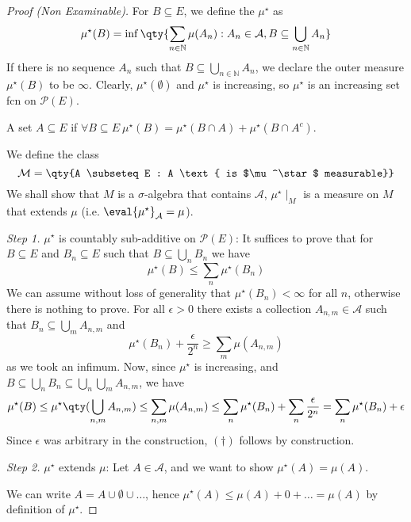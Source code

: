\begin{proof}[Proof (Non Examinable)]
	For $B \subseteq E$, we define the  $\mu^\star$ as
	\[ \mu^\star(B) = \inf \qty{\sum_{n \in \mathbb N} \mu(A_n) : A_n \in \mathcal A, B \subseteq \bigcup_{n \in \mathbb N} A_n} \]
	If there is no sequence $A_n$ such that $B \subseteq \bigcup_{n \in \mathbb N} A_n$, we declare the outer measure $\mu^\star(B)$ to be $\infty$.
	Clearly, $\mu^\star(\emptyset)$ and $\mu^\star$ is increasing, so $\mu^\star$ is an increasing set fcn on $\mathcal{P}(E)$.

	\begin{definition}
		A set $A \subseteq E$  if $\forall B \subseteq E \ \mu^\star(B) = \mu^\star(B \cap A) + \mu^\star(B \cap A^c)$.
	\end{definition}

	We define the class
	\[ \mathcal M = \qty{A \subseteq E : A \text{ is $\mu^\star$ measurable}} \]
	We shall show that $M$ is a $\sigma$-algebra that contains $\mathcal{A}$, $\mu^\star \mid_M$ is a measure on $M$ that extends $\mu$ (i.e. $\eval{\mu^\star}_\mathcal{A} = \mu$).

	\emph{Step 1.} $\mu^\star$ is countably sub-additive on $\mathcal P(E)$:
	It suffices to prove that for $B \subseteq E$ and $B_n \subseteq E$ such that $B \subseteq \bigcup_n B_n$ we have
	\begin{equation}
		\mu^\star(B) \leq \sum_n \mu^\star(B_n)
		\tag{\(\dagger\)}
	\end{equation}
	We can assume without loss of generality that $\mu^\star(B_n) < \infty$ for all $n$, otherwise there is nothing to prove.
	For all $\epsilon > 0$ there exists a collection $A_{n,m} \in \mathcal{A}$ such that $B_n \subseteq \bigcup_m A_{n,m}$ and
	\[ \mu^\star(B_n) + \frac{\epsilon}{2^n} \geq \sum_m \mu(A_{n,m}) \]
	as we took an infimum.
	Now, since $\mu^\star$ is increasing, and $B \subseteq \bigcup_n B_n \subseteq \bigcup_n \bigcup_m A_{n,m}$, we have
	\[ \mu^\star(B) \leq \mu^\star\qty(\bigcup_{n,m} A_{n,m}) \leq \sum_{n,m} \mu(A_{n,m}) \leq \sum_n \mu^\star(B_n) + \sum_n \frac{\epsilon}{2^n} = \sum_n \mu^\star(B_n) + \epsilon \]
	Since $\epsilon$ was arbitrary in the construction, $(\dagger)$ follows by construction.

	\emph{Step 2.} $\mu^\star$ extends $\mu$:
	Let $A \in \mathcal A$, and we want to show $\mu^\star(A) = \mu(A)$.

	We can write $A = A \cup \emptyset \cup \dots$, hence $\mu^\star(A) \leq \mu(A) + 0 + \dots = \mu(A)$ by definition of $\mu^\star$.


\end{proof}
